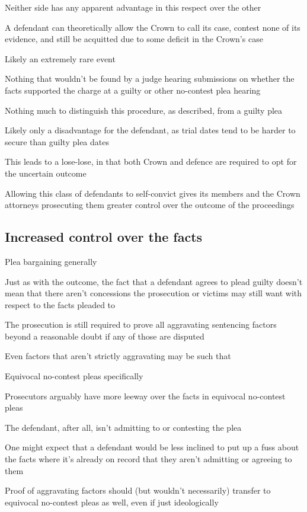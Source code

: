 Neither side has any apparent advantage in this respect over the other

A defendant can theoretically allow the Crown to call its case, contest none of its evidence, and still be acquitted due to some deficit in the Crown's case

Likely an extremely rare event

Nothing that wouldn't be found by a judge hearing submissions on whether the facts supported the charge at a guilty or other no-contest plea hearing

Nothing much to distinguish this procedure, as described, from a guilty plea

Likely only a disadvantage for the defendant, as trial dates tend to be harder to secure than guilty plea dates

This leads to a lose-lose, in that both Crown and defence are required to opt for the uncertain outcome

Allowing this class of defendants to self-convict gives its members and the Crown attorneys prosecuting them greater control over the outcome of the proceedings

\subsection{Increased control over the facts}

Plea bargaining generally

Just as with the outcome, the fact that a defendant agrees to plead guilty doesn't mean that there aren't concessions the prosecution or victims may still want with respect to the facts pleaded to

The prosecution is still required to prove all aggravating sentencing factors beyond a reasonable doubt if any of those are disputed

Even factors that aren't strictly aggravating may be such that

Equivocal no-contest pleas specifically

Prosecutors arguably have more leeway over the facts in equivocal no-contest pleas

The defendant, after all, isn't admitting to or contesting the plea

One might expect that a defendant would be less inclined to put up a fuss about the facts where it's already on record that they aren't admitting or agreeing to them

Proof of aggravating factors should (but wouldn't necessarily) transfer to equivocal no-contest pleas as well, even if just ideologically


